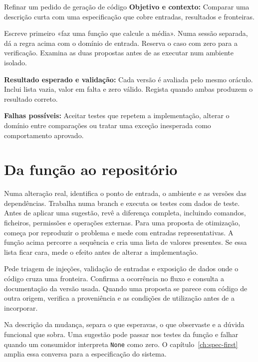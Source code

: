 \begin{promptlabbox}{Refinar um pedido de geração de código}
\textbf{Objetivo e contexto:} Comparar uma descrição curta com uma especificação que cobre entradas, resultados e fronteiras.

Escreve primeiro «faz uma função que calcule a média». Numa sessão separada, dá a regra acima com o domínio de entrada. Reserva o caso com zero para a verificação. Examina as duas propostas antes de as executar num ambiente isolado.

\textbf{Resultado esperado e validação:} Cada versão é avaliada pelo mesmo oráculo. Inclui lista vazia, valor em falta e zero válido. Regista quando ambas produzem o resultado correto.

\textbf{Falhas possíveis:} Aceitar testes que repetem a implementação, alterar o domínio entre comparações ou tratar uma exceção inesperada como comportamento aprovado.
\end{promptlabbox}

\section{Da função ao repositório}

Numa alteração real, identifica o ponto de entrada, o ambiente e as versões das dependências. Trabalha numa branch e executa os testes com dados de teste. Antes de aplicar uma sugestão, revê a diferença completa, incluindo comandos, ficheiros, permissões e operações externas. Para uma proposta de otimização, começa por reproduzir o problema e mede com entradas representativas. A função acima percorre a sequência e cria uma lista de valores presentes. Se essa lista ficar cara, mede o efeito antes de alterar a implementação.

Pede triagem de injeções, validação de entradas e exposição de dados onde o código cruza uma fronteira. Confirma a ocorrência no fluxo e consulta a documentação da versão usada. Quando uma proposta se parece com código de outra origem, verifica a proveniência e as condições de utilização antes de a incorporar.

Na descrição da mudança, separa o que esperavas, o que observaste e a dúvida funcional que sobra. Uma sugestão pode passar nos testes da função e falhar quando um consumidor interpreta \texttt{None} como zero. O capítulo~\ref{ch:spec-first} amplia essa conversa para a especificação do sistema.
